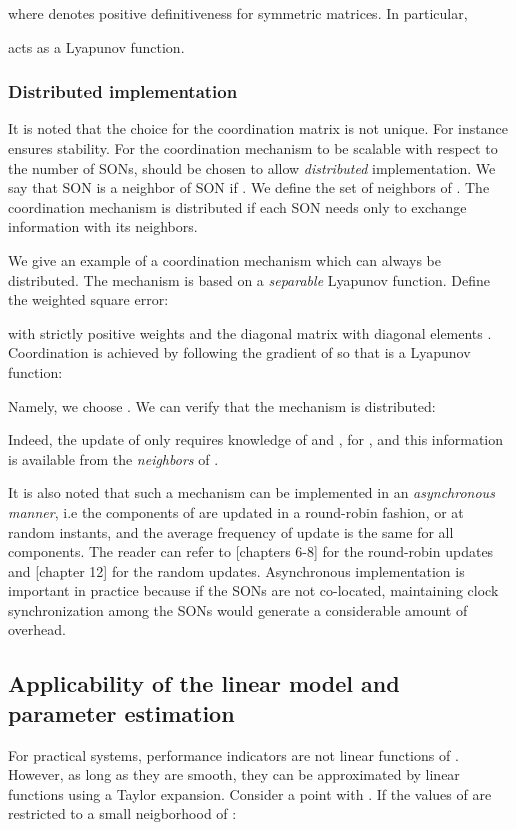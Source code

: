 \documentclass[10pt,conference,letterpaper]{IEEEtran}
\begin{document}
where  denotes positive definitiveness for symmetric matrices. In particular, 
 
acts as a Lyapunov function.
\subsubsection{Distributed implementation}	
	It is noted that the choice for the coordination matrix  is not unique. For instance  ensures stability. For the coordination mechanism to be scalable with respect to the number of \acp{SON},  should be chosen to allow \emph{distributed} implementation. We say that \ac{SON}  is a neighbor of \ac{SON}  if . We define  the set of neighbors of . The coordination mechanism is distributed if each \ac{SON} needs only to exchange information with its neighbors.
	
	We give an example of a coordination mechanism which can always be distributed. The mechanism is based on a \emph{separable} Lyapunov function. Define the weighted square error:

with  strictly positive weights and  the diagonal matrix with diagonal elements .
	Coordination is achieved by following the gradient of  so that  is a Lyapunov function:

	Namely, we choose . We can verify that the mechanism is distributed:

	Indeed, the update of  only requires knowledge of  and , for , and this information is available from the \emph{neighbors} of .
	
	It is also noted that such a mechanism can be implemented in an \emph{asynchronous manner}, i.e the components of  are updated in a round-robin fashion, or at random instants, and the average frequency of update is the same for all components. The reader can refer to \cite{Bertsekas}[chapters 6-8] for the round-robin updates  and \cite{Kushner}[chapter 12] for the random updates. Asynchronous implementation is important in practice because if the \acp{SON} are not co-located, maintaining clock synchronization among the \acp{SON} would generate a considerable amount of overhead.
\subsection{Applicability of the linear model and parameter estimation}
	For practical systems, performance indicators  are not linear functions of . However, as long as they are smooth, they can be approximated by linear functions using a Taylor expansion. Consider a point  with . If the values of  are restricted to a small neigborhood of :
\end{document}
